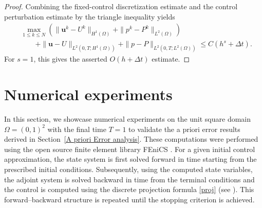 \documentclass{amsart}
\begin{document}
\begin{proof}
Combining the fixed-control discretization estimate and the control
perturbation estimate by the triangle inequality yields
\[
\begin{aligned}
&\max_{1\le k\le N}
\left(
\|\boldsymbol u^k-U^k\|_{H^1(\Omega)}
+
\|p^k-P^k\|_{L^2(\Omega)}
\right)
\\
&\qquad
+
\|\boldsymbol u-U\|_{L^2(0,T;H^1(\Omega))}
+
\|p-P\|_{L^2(0,T;L^2(\Omega))}
\le
C(h^s+\Delta t).
\end{aligned}
\]
For $s=1$, this gives the asserted $O(h+\Delta t)$ estimate.
\end{proof}
\section{Numerical experiments}\label{Numerical Experiments}
In this section, we showcase numerical experiments on the unit square domain $\Omega=(0,1)^2$ with the final time $T=1$ to validate the a priori error results derived in Section~\ref{A priori Error analysis}. These computations were performed using the open source finite element library FEniCS \cite{alnaes2015fenics}. For a given initial control approximation, the state system is first solved forward in time starting from the prescribed initial conditions. Subsequently, using the computed state variables, the adjoint system is solved backward in time from the terminal conditions and the control is computed using the discrete projection formula \eqref{proj} (see \cite[Algorithm~4.1]{HSAK2}). This forward--backward structure is repeated until the stopping criterion is achieved.
\end{document}
